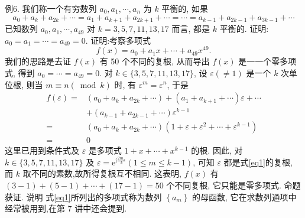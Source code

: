 例6. 我们称一个有穷数列 $a_0, a_1, \cdots, a_n$ 为 $k$ 平衡的, 如果
$$
a_0+a_k+a_{2 k}+\cdots=a_1+a_{k+1}+a_{2 k+1}+\cdots=\cdots=a_{k-1}+a_{2 k-1}+a_{3 k-1}+\cdots
$$
已知数列 $a_0, a_1, \cdots, a_{49}$ 对 $k=3,5,7,11,13,17$ 而言, 都是 $k$ 平衡的.
证明: $a_0=a_1=\cdots=a_{49}=0$.
证明:考察多项式
$$
f(x)=a_0+a_1 x+\cdots+a_{49} x^{49} . \label{eq1}
$$
我们的思路是去证 $f(x)$ 有 50 个不同的复根, 从而导出 $f(x)$ 是一一个零多项式, 得到 $a_0=\cdots=a_{49}=0$.
对 $k \in\{3,5,7,11,13,17\}$, 设 $\varepsilon(\neq 1)$ 是一个 $k$ 次单位根, 则当 $m \equiv n(\bmod k)$ 时, 有 $\varepsilon^m=\varepsilon^n$, 于是
$$
\begin{aligned}
f(\varepsilon)= & \left(a_0+a_k+a_{2 k}+\cdots\right)+\left(a_1+a_{k+1}+\cdots\right) \varepsilon+\cdots \\
& +\left(a_{k-1}+a_{2 k-1}+\cdots\right) \varepsilon^{k-1} \\
= & \left(a_0+a_k+a_{2 k}+\cdots\right)\left(1+\varepsilon+\varepsilon^2+\cdots+\varepsilon^{k-1}\right) \\
= & 0
\end{aligned}
$$
这里已用到条件式及 $\varepsilon$ 是多项式 $1+x+\cdots+x^{k-1}$ 的根.
因此, 对 $k \in\{3,5,7,11,13,17\}$ 及 $\varepsilon=\mathrm{e}^{\mathrm{i} \frac{2 m_x}{k}}(1 \leqslant m \leqslant k-1)$, 可知 $\varepsilon$ 都是式\ref{eq1}的复根, 而 $k$ 取不同的素数,故所得复根互不相同.
这表明, $f(x)$ 有 $(3-1)+(5-1)+\cdots+(17-1)=50$ 个不同复根, 它只能是零多项式.
命题获证.
说明 式\ref{eq1}所列出的多项式称为数列 $\left\{a_m\right\}$ 的母函数, 它在求数列通项中经常被用到,在第 7 讲中还会提到.


